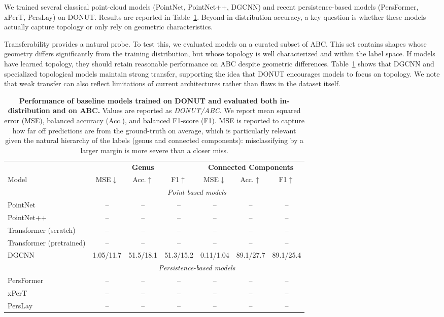 We trained several classical point-cloud models (PointNet, PointNet++, DGCNN) and recent persistence-based models (PersFormer, xPerT, PersLay) on DONUT. Results are reported in Table~\ref{tab:topogen-results}. Beyond in-distribution accuracy, a key question is whether these models actually capture topology or only rely on geometric characteristics.

Transferability provides a natural probe. To test this, we evaluated models on a curated subset of ABC. This set contains shapes whose geometry differs significantly from the training distribution, but whose topology is well characterized and within the label space. If models have learned topology, they should retain reasonable performance on ABC despite geometric differences. Table~\ref{tab:topogen-results} shows that DGCNN and specialized topological models maintain strong transfer, supporting the idea that DONUT encourages models to focus on topology. We note that weak transfer can also reflect limitations of current architectures rather than flaws in the dataset itself.

\begin{table}[h]
\centering
\begin{tabular}{l|ccc|ccc}
\toprule
 & \multicolumn{3}{c|}{\textbf{Genus}} & \multicolumn{3}{c}{\textbf{Connected Components}} \\
Model & MSE$\downarrow$ & Acc.$\uparrow$ & F1$\uparrow$ & MSE$\downarrow$ & Acc.$\uparrow$ & F1$\uparrow$ \\
\midrule
\multicolumn{1}{l}{} & \multicolumn{6}{c}{\textit{Point-based models}} \\
\midrule
PointNet~\cite{pointnet}   & -- & -- & -- & -- & -- & -- \\
PointNet++~\cite{pointnet++} &  -- & -- & -- & -- & -- & -- \\
Transformer (scratch) & -- & -- & -- & -- & -- & -- \\
Transformer (pretrained) & -- & -- & -- & -- & -- & -- \\
DGCNN~\cite{dgcnn}      & 1.05/11.7 & 51.5/18.1 & 51.3/15.2 & 0.11/1.04 & 89.1/27.7 & 89.1/25.4 \\
\midrule
\multicolumn{1}{l}{} & \multicolumn{6}{c}{\textit{Persistence-based models}} \\
\midrule
PersFormer~\cite{persformer} & -- & -- & -- & -- & -- & -- \\
xPerT~\cite{xpert}      & -- & -- & -- & -- & -- & -- \\
PersLay~\cite{perslay}    & -- & -- & -- & -- & -- & -- \\
\bottomrule
\end{tabular}
\caption{\textbf{Performance of baseline models trained on DONUT and evaluated both in-distribution and on ABC.} Values are reported as \textit{DONUT/ABC}. We report mean squared error (MSE), balanced accuracy (Acc.), and balanced F1-score (F1). MSE is reported to capture how far off predictions are from the ground-truth on average, which is particularly relevant given the natural hierarchy of the labels (genus and connected components): misclassifying by a larger margin is more severe than a closer miss. }
\label{tab:topogen-results}
\end{table}


